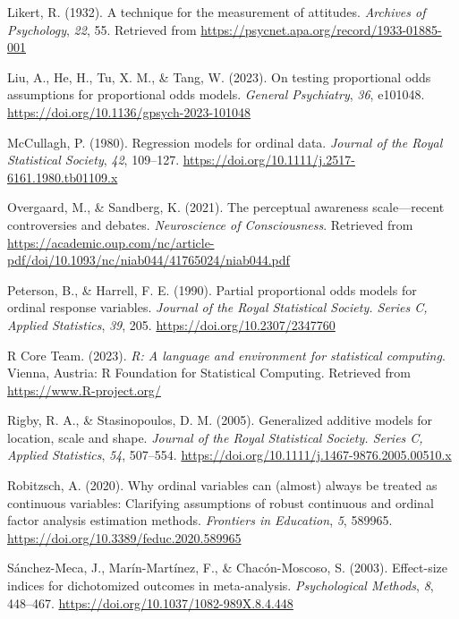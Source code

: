 \documentclass[
  man,floatsintext]{apa6}
\newlength{\cslhangindent}
\newenvironment{CSLReferences}[2] %
 {\begin{list}{}{%
  \setlength{\itemindent}{0pt}
  \setlength{\leftmargin}{0pt}
  \setlength{\parsep}{0pt}
  \ifodd #1
   \setlength{\leftmargin}{\cslhangindent}
   \setlength{\itemindent}{-1\cslhangindent}
  \fi
  \setlength{\itemsep}{#2\baselineskip}}}
 {\end{list}}
\begin{document}
\begin{CSLReferences}{1}{0}
Likert, R. (1932). A technique for the measurement of attitudes. \emph{Archives of Psychology}, \emph{22}, 55. Retrieved from \url{https://psycnet.apa.org/record/1933-01885-001}

Liu, A., He, H., Tu, X. M., \& Tang, W. (2023). On testing proportional odds assumptions for proportional odds models. \emph{General Psychiatry}, \emph{36}, e101048. \url{https://doi.org/10.1136/gpsych-2023-101048}

McCullagh, P. (1980). Regression models for ordinal data. \emph{Journal of the Royal Statistical Society}, \emph{42}, 109--127. \url{https://doi.org/10.1111/j.2517-6161.1980.tb01109.x}

Overgaard, M., \& Sandberg, K. (2021). The perceptual awareness scale---recent controversies and debates. \emph{Neuroscience of Consciousness}. Retrieved from \url{https://academic.oup.com/nc/article-pdf/doi/10.1093/nc/niab044/41765024/niab044.pdf}

Peterson, B., \& Harrell, F. E. (1990). Partial proportional odds models for ordinal response variables. \emph{Journal of the Royal Statistical Society. Series C, Applied Statistics}, \emph{39}, 205. \url{https://doi.org/10.2307/2347760}

R Core Team. (2023). \emph{R: A language and environment for statistical computing}. Vienna, Austria: R Foundation for Statistical Computing. Retrieved from \url{https://www.R-project.org/}

Rigby, R. A., \& Stasinopoulos, D. M. (2005). Generalized additive models for location, scale and shape. \emph{Journal of the Royal Statistical Society. Series C, Applied Statistics}, \emph{54}, 507--554. \url{https://doi.org/10.1111/j.1467-9876.2005.00510.x}

Robitzsch, A. (2020). Why ordinal variables can (almost) always be treated as continuous variables: Clarifying assumptions of robust continuous and ordinal factor analysis estimation methods. \emph{Frontiers in Education}, \emph{5}, 589965. \url{https://doi.org/10.3389/feduc.2020.589965}

Sánchez-Meca, J., Marín-Martínez, F., \& Chacón-Moscoso, S. (2003). Effect-size indices for dichotomized outcomes in meta-analysis. \emph{Psychological Methods}, \emph{8}, 448--467. \url{https://doi.org/10.1037/1082-989X.8.4.448}


\end{CSLReferences}
\end{document}
